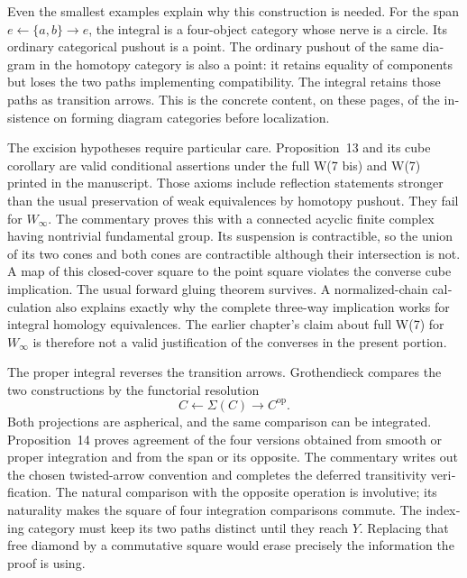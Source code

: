 \begin{otherlanguage}{english}
Even the smallest examples explain why this construction is needed. For the span $e\leftarrow\{a,b\}\to e$, the integral is a four-object category whose nerve is a circle. Its ordinary categorical pushout is a point. The ordinary pushout of the same diagram in the homotopy category is also a point: it retains equality of components but loses the two paths implementing compatibility. The integral retains those paths as transition arrows. This is the concrete content, on these pages, of the insistence on forming diagram categories before localization.

The excision hypotheses require particular care. Proposition~13 and its cube corollary are valid conditional assertions under the full W(7 bis) and W(7) printed in the manuscript. Those axioms include reflection statements stronger than the usual preservation of weak equivalences by homotopy pushout. They fail for $W_\infty$. The commentary proves this with a connected acyclic finite complex having nontrivial fundamental group. Its suspension is contractible, so the union of its two cones and both cones are contractible although their intersection is not. A map of this closed-cover square to the point square violates the converse cube implication. The usual forward gluing theorem survives. A normalized-chain calculation also explains exactly why the complete three-way implication works for integral homology equivalences. The earlier chapter's claim about full W(7) for $W_\infty$ is therefore not a valid justification of the converses in the present portion.

The proper integral reverses the transition arrows. Grothendieck compares the two constructions by the functorial resolution
\[
                         C\longleftarrow\Sigma(C)\longrightarrow C^{\mathrm{op}}.
\]
Both projections are aspherical, and the same comparison can be integrated. Proposition~14 proves agreement of the four versions obtained from smooth or proper integration and from the span or its opposite. The commentary writes out the chosen twisted-arrow convention and completes the deferred transitivity verification. The natural comparison with the opposite operation is involutive; its naturality makes the square of four integration comparisons commute. The indexing category must keep its two paths distinct until they reach $Y$. Replacing that free diamond by a commutative square would erase precisely the information the proof is using.


\end{otherlanguage}
